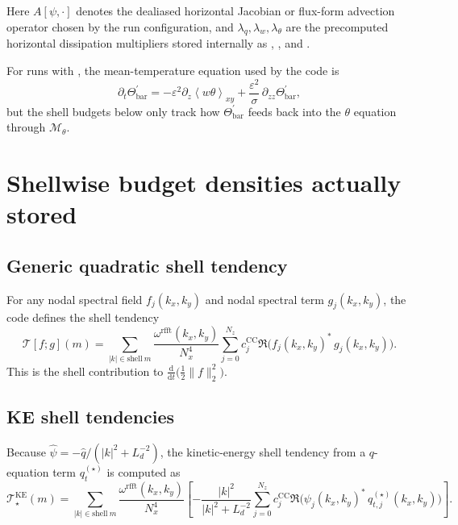 \documentclass[11pt]{article}
\newcommand{\avg}[1]{\left\langle #1 \right\rangle}
\newcommand{\dd}{\mathrm{d}}
\newcommand{\cc}{c^{\mathrm{CC}}}
\newcommand{\rr}{\omega^{\mathrm{rfft}}}
\newcommand{\psihat}{\widehat{\psi}}
\newcommand{\qhat}{\widehat{q}}
\begin{document}
Here \(A[\psi,\cdot]\) denotes the dealiased horizontal Jacobian or flux-form
advection operator chosen by the run configuration, and
\(\lambda_q,\lambda_w,\lambda_{\theta}\) are the precomputed horizontal
dissipation multipliers stored internally as
, , and
.

For runs with , the mean-temperature
equation used by the code is
\[
\partial_t \Theta_{\mathrm{bar}}^{\prime}
=
-\varepsilon^2 \partial_z \avg{w\theta}_{xy}
+ \frac{\varepsilon^2}{\sigma}\,\partial_{zz}\Theta_{\mathrm{bar}}^{\prime},
\]
but the shell budgets below only track how \(\Theta_{\mathrm{bar}}^{\prime}\)
feeds back into the \(\theta\) equation through \(\mathcal{M}_{\theta}\).

\section{Shellwise budget densities actually stored}

\subsection{Generic quadratic shell tendency}

For any nodal spectral field \(f_j(k_x,k_y)\) and nodal spectral term
\(g_j(k_x,k_y)\), the code defines the shell tendency
\[
\mathcal{T}[f;g](m)
=
\sum_{|k|\in \mathrm{shell}\ m}
\frac{\rr(k_x,k_y)}{N_x^4}
\sum_{j=0}^{N_z}\cc_j
\Re\!\bigl(f_j(k_x,k_y)^*\, g_j(k_x,k_y)\bigr).
\]
This is the shell contribution to
\(\frac{\dd}{\dd t}\bigl(\frac12 \|f\|_2^2\bigr)\).

\subsection{KE shell tendencies}

Because \(\psihat = -\qhat/(|k|^2+L_d^{-2})\), the kinetic-energy shell tendency
from a \(q\)-equation term \(q_t^{(\star)}\) is computed as
\[
\mathcal{T}^{\mathrm{KE}}_{\star}(m)
=
\sum_{|k|\in \mathrm{shell}\ m}
\frac{\rr(k_x,k_y)}{N_x^4}
\left[
-\frac{|k|^2}{|k|^2 + L_d^{-2}}
\sum_{j=0}^{N_z}\cc_j
\Re\!\bigl(\psi_j(k_x,k_y)^*\, q_{t,j}^{(\star)}(k_x,k_y)\bigr)
\right].
\]
\end{document}
